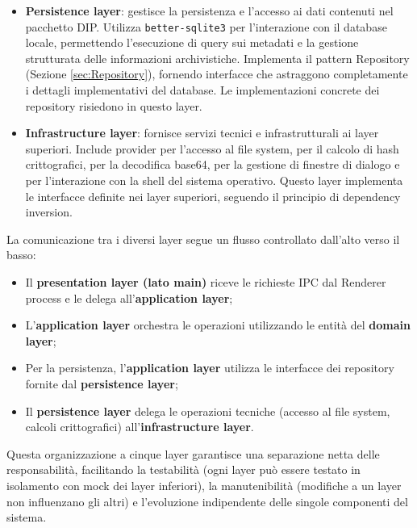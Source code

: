 \documentclass[a4paper,12pt]{article}
\begin{document}
{{{\begin{itemize}
                    Questo layer è completamente indipendente dai dettagli infrastrutturali e non ha dipendenze verso layer esterni, incarnando il principio dell'\textit{Hexagonal Architecture} (core del dominio isolato).
                    \item \textbf{Persistence layer}: gestisce la persistenza e l'accesso ai dati contenuti nel pacchetto DIP.
                    Utilizza \verb|better-sqlite3| per l'interazione con il database locale, permettendo l'esecuzione di query sui metadati e la gestione strutturata delle informazioni archivistiche.
                    Implementa il pattern Repository (Sezione \ref{sec:Repository}), fornendo interfacce che astraggono completamente i dettagli implementativi del database.
                    Le implementazioni concrete dei repository risiedono in questo layer.
                    \item \textbf{Infrastructure layer}: fornisce servizi tecnici e infrastrutturali ai layer superiori.
                    Include provider per l'accesso al file system, per il calcolo di hash crittografici, per la decodifica base64, per la gestione di finestre di dialogo e per l'interazione con la shell del sistema operativo.
                    Questo layer implementa le interfacce definite nei layer superiori, seguendo il principio di dependency inversion.
                \end{itemize}

                \noindent La comunicazione tra i diversi layer segue un flusso controllato 
                dall'alto verso il basso:
                \begin{itemize}
                    \item Il \textbf{presentation layer (lato main)} riceve le richieste IPC dal Renderer process e le delega all'\textbf{application layer};
                    \item L'\textbf{application layer} orchestra le operazioni utilizzando le entità del \textbf{domain layer};
                    \item Per la persistenza, l'\textbf{application layer} utilizza le interfacce dei repository fornite dal \textbf{persistence layer};
                    \item Il \textbf{persistence layer} delega le operazioni tecniche (accesso al file system, calcoli crittografici) all'\textbf{infrastructure layer}.
                \end{itemize}

                \noindent Questa organizzazione a cinque layer garantisce una separazione netta delle responsabilità, facilitando la testabilità (ogni layer può essere testato in isolamento con mock dei layer inferiori), la manutenibilità (modifiche a un layer non influenzano gli altri) e l'evoluzione indipendente delle singole componenti del sistema.
            }
            
}}
\end{document}
